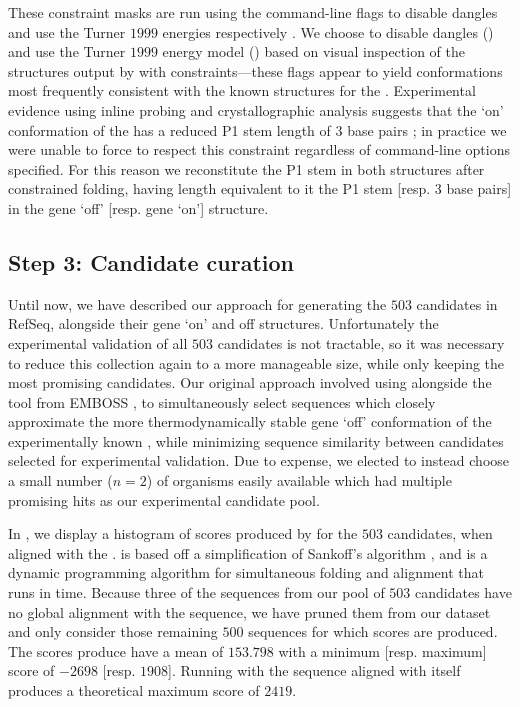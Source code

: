 These constraint masks are run using the command-line flags
 to disable dangles and use the Turner $1999$
energies respectively \citep{mathews:1999jw}. We choose to disable dangles () and use
the Turner $1999$ energy model ()
based on visual inspection of the structures output by \rfold with
constraints---these flags appear to yield conformations most frequently consistent
with the known structures for the \Bsxpt \grb.
Experimental evidence using inline probing and
crystallographic analysis suggests that
the `on' conformation of the \grb has a reduced P1 stem length of $3$ base pairs
\citep{mandalboesebarrickwinklerbreaker,serganov:2004dq};
in practice we were unable to force \rfold to respect this constraint regardless
of command-line options specified. For this reason we reconstitute the P1 stem in
both structures after constrained folding, having length equivalent to it the
\infernal P1 stem [resp. $3$ base pairs] in the gene `off' [resp. gene `on']
structure.

\subsection{Step 3: Candidate curation}
\label{subsec:rfinder:curation}

Until now, we have described our approach for generating the $503$ \grb candidates
in RefSeq, alongside their gene `on' and off structures. Unfortunately the
experimental validation of all $503$ candidates is not tractable, so it was
necessary to reduce this collection again to a more manageable size, while only
keeping the most promising candidates. Our original approach involved using
\foldalign \citep{gorodkin:1997tr,havgaard:2007ca} alongside the  tool from EMBOSS
\citep{rice:2000wr}, to simultaneously
select sequences which closely approximate the more thermodynamically stable
gene `off' conformation of the experimentally known \Bsxpt \grb, while minimizing
sequence similarity between candidates selected for experimental validation. Due to
expense, we elected to instead choose a small number
($n = 2$) of organisms easily available which had multiple promising hits as our
experimental candidate pool.

In , we display a histogram of scores produced
by \foldalign for the $503$ candidates, when aligned with the \Bsxpt \grb. \foldalign
is based off a simplification of Sankoff's algorithm \citep{sankoff:1985wc}, and
is a dynamic programming
algorithm for simultaneous folding and alignment that runs in  time. Because three of the sequences from our pool of $503$ candidates have
no global alignment with the \Bsxpt sequence, we have pruned them from our
dataset and only consider those remaining $500$ sequences for which \foldalign
scores are produced. The \foldalign scores produce have a mean of $153.798$ with a
minimum [resp. maximum] score of $-2698$ [resp. $1908$]. Running \foldalign with the
\Bsxpt sequence aligned with itself produces a theoretical maximum score of $2419$.

